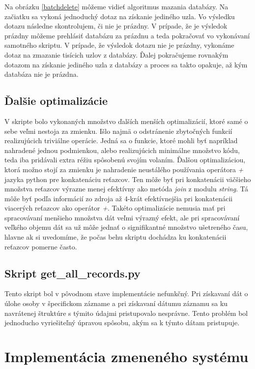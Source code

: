 Na obrázku \ref{batchdelete} môžeme vidieť algoritmus mazania databázy. Na začiatku sa vykoná jednoduchý dotaz na získanie jediného uzla. Vo výsledku dotazu následne skontrolujem, či nie je prázdny. V prípade, že je výsledok prázdny môžeme prehlásiť databázu za prázdnu a teda pokračovať vo vykonávaní samotného skriptu. V prípade, že výsledok dotazu nie je prázdny, vykonáme dotaz na zmazanie tisícich uzlov z databázy. Ďalej pokračujeme rovnakým dotazom na získanie jediného uzla z databázy a proces sa takto opakuje, až kým databáza nie je prázdna.

\subsection{Ďalšie optimalizácie}

V skripte bolo vykonaných množstvo ďalších menších optimalizácií, ktoré samé o sebe veľmi nestoja za zmienku. Išlo najmä o odstránenie zbytočných funkcií realizujúcich triviálne operácie. Jedná sa o funkcie, ktoré mohli byť napríklad nahradené jednou podmienkou, alebo realizujúcich minimálne množstvo kódu, teda iba pridávali extra réžiu spôsobenú svojím volaním. Ďalšou optimalizáciou, ktorá možno stojí za zmienku je nahradenie neustálého používania operátora \textit{+} jazyka python pre konkatenáciu reťazcov. Ten môže byť pri konkatenácii väčšieho množstva reťazcov výrazne menej efektívny ako metóda \textit{join} z modulu \textit{string}. Tá môže byť podľa informácií zo zdroja \cite{plusop} až 4-krát efektívnejšia pri konkatenácii viacerých reťazcov ako operátor \textit{+}. Takéto optimalizácie nemusia mať pri spracovávaní menšieho množstva dát veľmi výrazný efekt, ale pri spracovávaní veľkého objemu dát sa už môže jednať o signifikantné množstvo ušetreného času, hlavne ak si uvedomíme, že počas behu skriptu dochádza ku konkatenácii reťazcov pomerne často.

\subsection{Skript get\_all\_records.py}

Tento skript bol v pôvodnom stave implementácie nefunkčný. Pri získavaní dát o úlohe osoby v špecifickom zázname a pri získavaní dátumu záznamu sa ku navrátenej štruktúre s týmito údajmi pristupovalo nesprávne. Tento problém bol jednoducho vyriešiteľný úpravou spôsobu, akým sa k týmto dátam pristupuje.

\section{Implementácia zmeneného systému}

